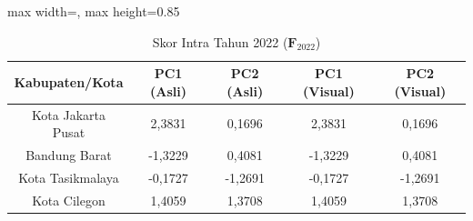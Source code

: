 \begin{table}[H]
\centering
\caption{Skor Intra Tahun 2022 ($\mathbf{F}_{2022}$)} \label{tab:sample2skor_intra_2022}
\begin{adjustbox}{max width=\textwidth, max height=0.85\textheight}
\begin{tabular}{|c|c|c|c|c|}
\hline
\textbf{Kabupaten/Kota} & \textbf{PC1 (Asli)} & \textbf{PC2 (Asli)} & \textbf{PC1 (Visual)} & \textbf{PC2 (Visual)} \\
\hline
Kota Jakarta Pusat & 2,3831 & 0,1696 & 2,3831 & 0,1696 \\
Bandung Barat & -1,3229 & 0,4081 & -1,3229 & 0,4081 \\
Kota Tasikmalaya & -0,1727 & -1,2691 & -0,1727 & -1,2691 \\
Kota Cilegon & 1,4059 & 1,3708 & 1,4059 & 1,3708 \\
\hline
\end{tabular}
\end{adjustbox}
\end{table}